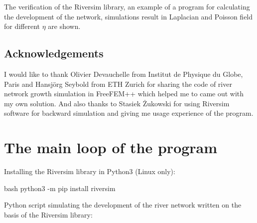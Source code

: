 \documentclass[]{pracamgr}
\begin{document}
    The verification of the Riversim library, an example of a program for calculating the development of the network, simulations result in Laplacian and Poisson field for different $\eta$ are shown.\par

    \section*{Acknowledgements}
      
      I would like to thank Olivier Devauchelle from Institut de Physique du Globe, Paris and Hansjörg Seybold from ETH Zurich for sharing the code of river network growth simulation in FreeFEM++ which helped me to came out with my own solution. And also thanks to Stasiek Żukowski for using Riversim software for backward simulation and giving me usage experience of the program.

    

  \appendix

  \chapter{The main loop of the program}
    
    Installing the Riversim library in Python3 (Linux only):
    
    \begin{mintedbox}{bash} 
      python3 -m pip install riversim\end{mintedbox}
    
    Python script simulating the development of the river network written on the basis of the Riversim library:
\end{document}
